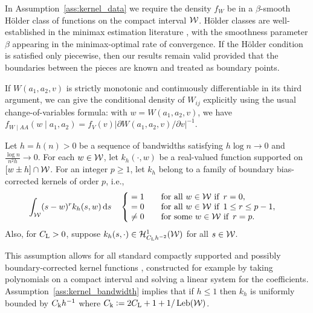 In Assumption~\ref{ass:kernel_data} we require the density $f_W$ be in a
$\beta$-smooth H\"older class of functions on the compact interval $\mathcal{W}$.
H\"older classes are well-established in the minimax estimation literature
\citep{gine2021mathematical}, with the smoothness parameter $\beta$ appearing
in the minimax-optimal rate of convergence. If the H\"older condition is
satisfied only piecewise, then our results remain valid provided that the
boundaries between the pieces are known and treated as boundary points.

If $W(a_1, a_2, v)$ is strictly monotonic and continuously differentiable in
its third argument, we can give the conditional density of $W_{i j}$ explicitly
using the usual change-of-variables formula: with $w=W(a_1,a_2,v)$, we have
$f_{W \mid AA}(w \mid a_1,a_2)
= f_V(v) \big|\partial W(a_1,a_2,v)/\partial v\big|^{-1}$.

\begin{assumption}\label{ass:kernel_bandwidth}%

  Let $h = h(n) > 0$ be a sequence of bandwidths satisfying $h \log n \to 0$
  and $\frac{\log n}{n^2h} \to 0$. For each $w \in \mathcal{W}$, let $k_h(\cdot, w)$ be
  a real-valued function supported on $[w \pm h] \cap \mathcal{W}$. For an integer
  $p \geq 1$, let $k_h$ belong to a family of boundary bias-corrected kernels
  of order $p$, i.e.,
  \begin{align*}
    \int_{\mathcal{W}}
    (s-w)^r k_h(s,w) \,\mathrm{d}s
    \quad
    \begin{cases}
      \begin{alignedat}{2}
        &= 1 &\qquad &\text{for all } w \in \mathcal{W} \text{ if }\, r = 0, \\
        &= 0 & &\text{for all } w \in \mathcal{W} \text{ if }\, 1 \leq r \leq p-1, \\
        &\neq 0 & &\text{for some } w \in \mathcal{W} \text{ if }\, r = p.
      \end{alignedat}
    \end{cases}
  \end{align*}
  Also, for $C_{\mathrm{L}} > 0$,
  suppose $k_h(s, \cdot) \in \mathcal{H}^1_{C_{\mathrm{L}} h^{-2}}(\mathcal{W})$
  for all $s \in \mathcal{W}$.
\end{assumption}

This assumption allows for all standard compactly supported and possibly
boundary-corrected kernel functions
\citep{wand1994kernel,simonoff2012smoothing}, constructed for example by taking
polynomials on a compact interval and solving a linear system for the
coefficients. Assumption~\ref{ass:kernel_bandwidth} implies that if $h \leq 1$
then $k_h$ is uniformly bounded by
$C_{\mathrm{k}} h^{-1}$ where $C_{\mathrm{k}} \vcentcolon = 2 C_{\mathrm{L}} + 1 + 1/\operatorname{Leb}(\mathcal{W})$.

